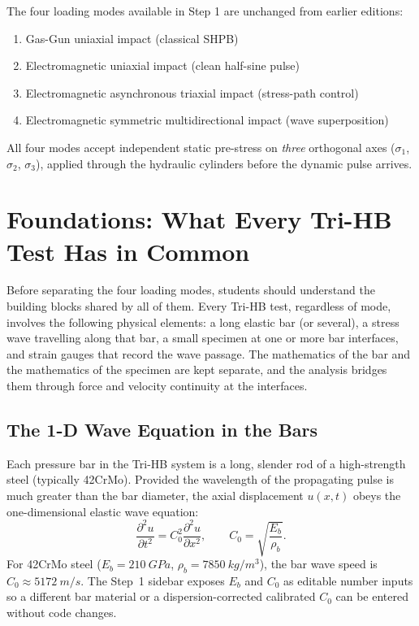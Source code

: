 \documentclass[11pt,a4paper]{article}
\providecommand{\SI}[2]{\qty{#1}{#2}}
\newcommand{\sig}{\sigma}
\newcommand{\Cz}{C_0}
\begin{document}
\begin{center}
\begin{tcolorbox}[colback=boxgrey, colframe=midblue, width=0.88\textwidth, arc=3pt]
The four loading modes available in Step 1 are unchanged from earlier editions:
\begin{enumerate}[leftmargin=2.4em, itemsep=2pt]
  \item Gas-Gun uniaxial impact (classical SHPB)
  \item Electromagnetic uniaxial impact (clean half-sine pulse)
  \item Electromagnetic asynchronous triaxial impact (stress-path control)
  \item Electromagnetic symmetric multidirectional impact (wave superposition)
\end{enumerate}

All four modes accept independent static pre-stress on \emph{three} orthogonal
axes ($\sig_1$, $\sig_2$, $\sig_3$), applied through the hydraulic cylinders
before the dynamic pulse arrives.
\end{tcolorbox}
\end{center}

\newpage
\tableofcontents
\newpage

\section{Foundations: What Every Tri-HB Test Has in Common}

Before separating the four loading modes, students should understand the building
blocks shared by all of them. Every Tri-HB test, regardless of mode, involves the
following physical elements: a long elastic bar (or several), a stress wave
travelling along that bar, a small specimen at one or more bar interfaces, and
strain gauges that record the wave passage. The mathematics of the bar and the
mathematics of the specimen are kept separate, and the analysis bridges them
through force and velocity continuity at the interfaces.

\subsection{The 1-D Wave Equation in the Bars}

Each pressure bar in the Tri-HB system is a long, slender rod of a high-strength
steel (typically 42CrMo). Provided the wavelength of the propagating pulse
is much greater than the bar diameter, the axial displacement $u(x,t)$ obeys the
one-dimensional elastic wave equation:
\begin{equation}
  \frac{\partial^2 u}{\partial t^2} = \Cz^2 \frac{\partial^2 u}{\partial x^2},
  \qquad \Cz = \sqrt{\frac{E_b}{\rho_b}}.
  \label{eq:wave}
\end{equation}
For 42CrMo steel ($E_b = \SI{210}{GPa}$, $\rho_b = \SI{7850}{kg/m^3}$),
the bar wave speed is $\Cz \approx \SI{5172}{m/s}$. The Step~1 sidebar exposes
$E_b$ and $\Cz$ as editable number inputs so a different bar material or a
dispersion-corrected calibrated $\Cz$ can be entered without code changes.
\end{document}

